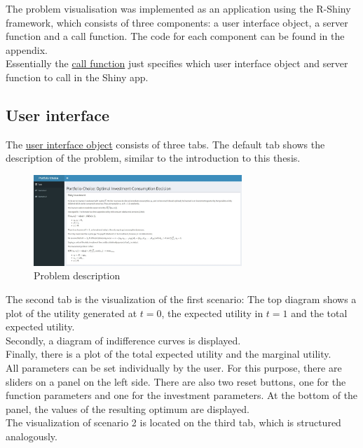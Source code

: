 The problem visualisation was implemented as an application using the R-Shiny framework, which consists of three components: a user interface object, a server function and a call function. The code for each component can be found in the appendix.\\

\noindent Essentially the \hyperlink{call function}{call function} just specifies which user interface object and server function to call in the Shiny app.

\bigskip

\subsection{User interface}

\noindent The \hyperlink{User interface}{user interface object} consists of three tabs. The default tab shows the description of the problem, similar to the introduction to this thesis.\\

\begin{figure}[h!]
    \centering
    \includegraphics[width=0.7\textwidth, trim = 0 0 0 0,clip]{files/1.1.jpg}
    \caption{Problem description}
\end{figure}

\bigskip

\noindent The second tab is the visualization of the first scenario: The top diagram shows a plot of the utility generated at $t=0$, the expected utility in $t=1$ and the total expected utility.\\
Secondly, a diagram of indifference curves is displayed.\\
Finally, there is a plot of the total expected utility and the marginal utility. \\
All parameters can be set individually by the user. For this purpose, there are sliders on a panel on the left side. There are also two reset buttons, one for the function parameters and one for the investment parameters. At the bottom of the panel, the values of the resulting optimum are displayed.\\
The visualization of scenario 2 is located on the third tab, which is structured analogously.

